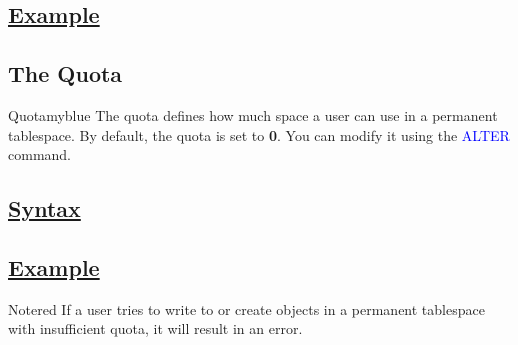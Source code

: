 \vspace{0.15cm}
\subsection*{\underline{Example}}




\vspace{0.25cm}


\subsection{The Quota}
\begin{prettyBox}{Quota}{myblue}
The quota defines how much space a user can use in a permanent tablespace. 
By default, the quota is set to \textbf{0}. You can modify it using the \textcolor{blue}{ALTER} command.
\end{prettyBox}

\newpage
\subsection*{\underline{Syntax}}


\vspace{0.15cm}
\subsection*{\underline{Example}}


\vspace{0.25cm}
\begin{prettyBox}{Note}{red}
If a user tries to write to or create objects in a permanent tablespace with insufficient quota, it will result in an error.
\end{prettyBox}

